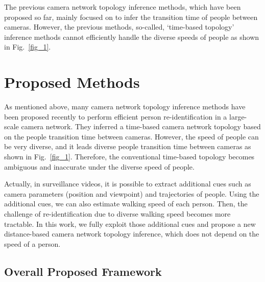 \documentclass[10pt,twocolumn,letterpaper]{article}
\begin{document}
	The previous camera network topology inference methods, which have been proposed so far, mainly focused on to infer the transition time of people between cameras.
	However, the previous methods, so-called, `time-based topology' inference methods cannot efficiently handle the diverse speeds of people as shown in Fig.~\ref{fig_1}.
	
	
	\section{Proposed Methods}
	\label{sec:proposed}
	
	As mentioned above, many camera network topology inference methods have been proposed recently to perform efficient person re-identification in a large-scale camera network.
	They inferred a time-based camera network topology based on the people transition time between cameras. However, the speed of people can be very diverse, and it leads diverse people transition time between cameras as shown in Fig.~\ref{fig_1}.
	Therefore, the conventional time-based topology becomes ambiguous and inaccurate under the diverse speed of people.
	
	Actually, in surveillance videos, it is possible to extract additional cues such as camera parameters (position and viewpoint) and trajectories of people.
	Using the additional cues, we can also estimate walking speed of each person. Then, the challenge of re-identification due to diverse walking speed becomes more tractable.
	In this work, we fully exploit those additional cues and propose a new distance-based camera network topology inference, which does not depend on the speed of a person.
	
	\subsection{Overall Proposed Framework}
	\label{subsec:overall}
	
\end{document}
